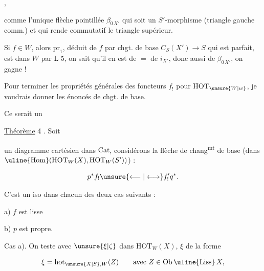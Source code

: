 ,

comme l'unique flèche pointillée $\beta_{0\,X'}$ qui soit un $S'$-morphisme (triangle gauche comm.) et qui rende commutatif le triangle supérieur.

Si $f\in W$, alors $\mathrm{pr}_1$, déduit de $f$ par chgt. de base $C_S(X')\longrightarrow S$ qui est parfait, est dans $W$ par L 5, on sait qu'il en est de $=$ de $i_{X'}$, donc aussi de $\beta_{0\,X'}$, on gagne !


Pour terminer les propriétés générales des foncteurs $f_!$ pour $\mathrm{HOT}_{\unsure{W|w}}$, je voudrais donner les énoncés  de chgt. de base.

Ce serait un

\uline{Théorème}  4 . Soit


un diagramme cartésien dans $\mathrm{Cat}$, considérons la flèche de chang\textsuperscript{mt} de base (dans $\uline{\mathrm{Hom}}(\mathrm{HOT}_W(X),\mathrm{HOT}_W(S'))$) :

\[
 p^*f_!\unsure{\longleftarrow|\longleftrightarrow}f'_!q^*.
\]

C'est un iso dans chacun des deux cas suivants :

a) $f$ est  lisse

b) $p$ est propre.



\uline{} Cas a). On teste avec $\unsure{\xi|\zeta}$ dans $\mathrm{HOT}_W(X)$,  $\xi$ de la forme

\[
 \xi=\mathrm{hot}_{\unsure{X|S},W}(Z)\qquad\text{avec }Z\in\mathrm{Ob}\,\uline{\mathrm{Liss}}\,X,
\]

